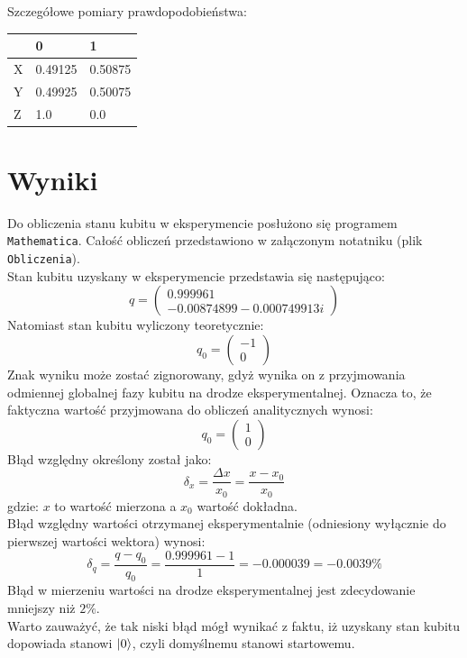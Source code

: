 \documentclass{article}
\begin{document}
Szczegółowe pomiary prawdopodobieństwa:\\
\begin{center}
\begin{tabular}{l|l|l|}
\cline{2-3}
                        & 0       & 1       \\ \hline
\multicolumn{1}{|l|}{X} & 0.49125 & 0.50875 \\ \hline
\multicolumn{1}{|l|}{Y} & 0.49925 & 0.50075 \\ \hline
\multicolumn{1}{|l|}{Z} & 1.0     & 0.0     \\ \hline
\end{tabular}
\end{center}
\section{Wyniki}
Do obliczenia stanu kubitu w eksperymencie posłużono się programem \verb+Mathematica+. Całość obliczeń przedstawiono w załączonym notatniku (plik \verb+Obliczenia+).\\
Stan kubitu uzyskany w eksperymencie przedstawia się następująco:
$$ q=\left(\begin{matrix}0.999961 \\-0.00874899-0.000749913 i\end{matrix}\right)$$
Natomiast stan kubitu wyliczony teoretycznie:
$$q_0=\left(\begin{matrix}-1\\0\end{matrix}\right)$$
Znak wyniku może zostać zignorowany, gdyż wynika on z przyjmowania odmiennej globalnej fazy kubitu na drodze eksperymentalnej. Oznacza to, że faktyczna wartość przyjmowana do obliczeń analitycznych wynosi:
$$q_0=\left(\begin{matrix}1\\0\end{matrix}\right)$$
Błąd względny określony został jako: $$\delta_x=\frac{\Delta x}{x_0}=\frac{x-x_0}{x_0}$$ gdzie: $x$ to wartość mierzona a $x_0$ wartość dokładna.\\
Błąd względny wartości otrzymanej eksperymentalnie (odniesiony wyłącznie do pierwszej wartości wektora) wynosi:
$$\delta_q=\frac{q-q_0}{q_0}=\frac{0.999961-1}{1}=-0.000039=-0.0039\%$$
Błąd w mierzeniu wartości na drodze eksperymentalnej jest zdecydowanie mniejszy niż $2\%$.\\
Warto zauważyć, że tak niski błąd mógł wynikać z faktu, iż uzyskany stan kubitu dopowiada stanowi $\ket{0}$, czyli domyślnemu stanowi startowemu.
\end{document}
